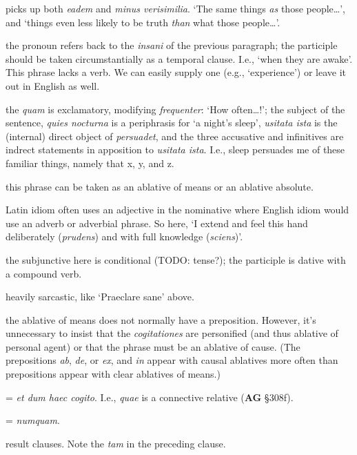  picks up both \textit{eadem} and \textit{minus verisimilia}. `The same things \textit{as} those people\dots', and `things even less likely to be truth \textit{than} what those people\dots'.

 the pronoun refers back to the \textit{insani} of the previous paragraph; the participle should be taken circumstantially as a temporal clause. I.e., `when they are awake'. This phrase lacks a verb. We can easily supply one (e.g., `experience') or leave it out in English as well.

 the \textit{quam} is exclamatory, modifying \textit{frequenter}: `How often\dots !'; the subject of the sentence, \textit{quies nocturna} is a periphrasis for `a night's sleep', \textit{usitata ista} is the (internal) direct object of \textit{persuadet}, and the three accusative and infinitives are indrect statements in apposition to \textit{usitata ista}. I.e., sleep persuades me of these familiar things, namely that x, y, and z.

 this phrase can be taken as an ablative of means or an ablative absolute.

 Latin idiom often uses an adjective in the nominative where English idiom would use an adverb or adverbial phrase. So here, `I extend and feel this hand deliberately (\textit{prudens}) and with full knowledge (\textit{sciens})'.

 the subjunctive here is conditional (TODO: tense?); the participle is dative with a compound verb.

 heavily sarcastic, like `Praeclare sane' above.

 the ablative of means does not normally have a preposition. However, it's unnecessary to insist that the \textit{cogitationes} are personified (and thus ablative of personal agent) or that the phrase must be an ablative of cause. (The prepositions \textit{ab}, \textit{de}, or \textit{ex}, and \textit{in} appear with causal ablatives more often than prepositions appear with clear ablatives of means.)

 = \textit{et dum haec cogito}. I.e., \textit{quae} is a connective relative (\textbf{AG} §308f).

 = \textit{numquam}.

 result clauses. Note the \textit{tam} in the preceding clause.

